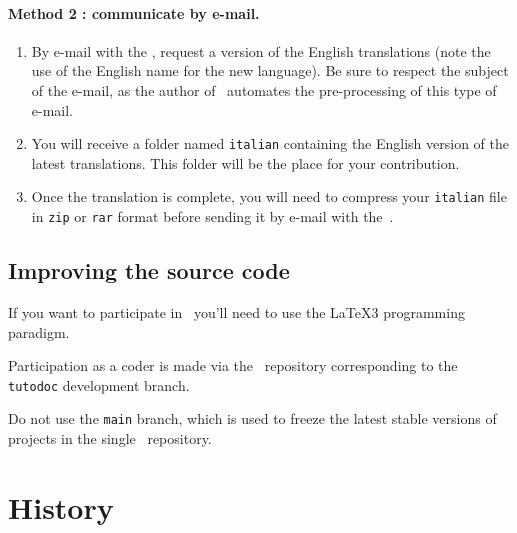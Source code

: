 \paragraph{Method 2 : communicate by e-mail.}

\begin{enumerate}
      \item By e-mail with the , request a version of the English translations (note the use of the English name for the new language).
    Be sure to respect the subject of the e-mail, as the author of \thisproj\ automates the pre-processing of this type of e-mail.

      \item You will receive a folder named \verb#italian# containing the English version of the latest translations.
    This folder will be the place for your contribution.

      \item Once the translation is complete, you will need to compress your \verb#italian# file in \verb#zip# or \verb#rar# format before sending it by e-mail with the \,.
\end{enumerate}



\subsection{Improving the source code}

\begin{tdocimp}
    If you want to participate in \thisproj\, you'll need to use the \LaTeX3 programming paradigm.
\end{tdocimp}


Participation as a coder is made via the \thisrepo\ repository corresponding to the \verb#tutodoc# development branch.


\begin{tdoccaut}
Do not use the \verb#main# branch, which is used to freeze the latest stable versions of projects in the single \thismonorepo\ repository.
\end{tdoccaut}


\section{History}

